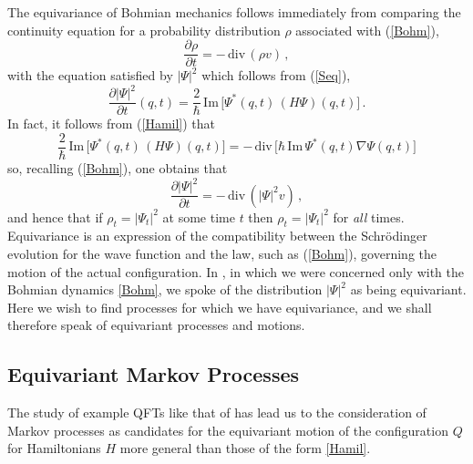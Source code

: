 \documentclass[12pt]{article}
\newcommand{\1}{\mathbf{1}} %
\renewcommand{\Im}{\mathrm{Im}} %
\renewcommand{\div}{\,\mathrm{div}\,} %
\begin{document}
The equivariance of Bohmian mechanics follows immediately from comparing
the continuity equation for a probability distribution $\rho$
associated with (\ref{Bohm}),
\begin{equation}\label{master}
   \frac{\partial \rho}{\partial t} = -\div(\rho v)\,,
\end{equation}
with the equation satisfied by $|\Psi|^2$ which follows from
(\ref{Seq}),
\begin{equation}\label{continuity1}
   \frac{\partial |\Psi|^2}{\partial t}(q,t) = \frac{2}{\hbar} \, \Im
   \, \Big[ \Psi^*(q,t)\, (H\Psi)(q,t) \Big]\,.
\end{equation}
In fact, it follows from (\ref{Hamil}) that
\begin{equation}\label{JJJ}
   \frac{2}{\hbar} \, \Im \, \Big[ \Psi^*(q,t)\, (H\Psi)(q,t) \Big]=
   -\div\Big[\hbar \, \Im \, \Psi^*(q,t) \nabla\Psi(q,t)  \Big]
\end{equation}
so, recalling (\ref{Bohm}), one obtains that
\begin{equation}\label{continuity2}
   \frac{\partial |\Psi|^2}{\partial t} =  -\div(|\Psi|^2 v)\,,
\end{equation}
and hence that if $\rho_t=|\Psi_t|^2$ at some time $t$ then
$\rho_t=|\Psi_t|^2$ for \emph{all} times.  Equivariance is an
expression of the compatibility between the Schr\"odinger evolution
for the wave function and the law, such as (\ref{Bohm}), governing the
motion of the actual configuration.  In \cite{DGZ}, in which we were
concerned only with the Bohmian dynamics \eqref{Bohm}, we spoke of the
distribution $|\Psi|^2$ as being equivariant.  Here we wish to find
processes for which we have equivariance, and we shall therefore speak
of equivariant processes and motions.


\subsection{Equivariant Markov Processes}

The study of example QFTs like that of \cite{crea1} has lead us to the
consideration of Markov processes as candidates for the equivariant
motion of the configuration $Q$ for Hamiltonians $H$ more general than
those of the form \eqref{Hamil}.
\end{document}
